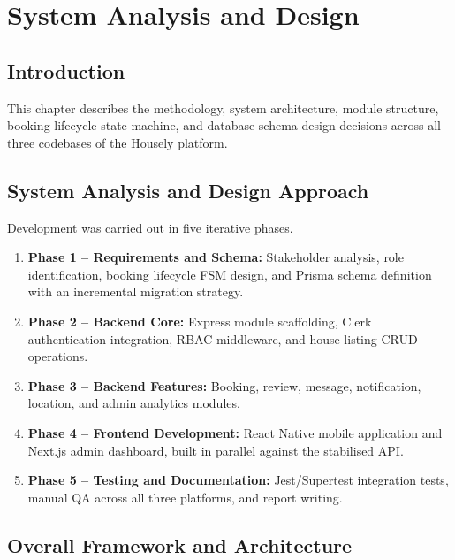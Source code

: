 \documentclass[12pt,a4paper]{report}
\begin{document}
\chapter{System Analysis and Design}
\label{chap:design}

\section{Introduction}

This chapter describes the methodology, system architecture, module structure, booking
lifecycle state machine, and database schema design decisions across all three codebases
of the Housely platform.

\section{System Analysis and Design Approach}

Development was carried out in five iterative phases.

\begin{enumerate}[noitemsep]
  \item \textbf{Phase 1 -- Requirements and Schema:} Stakeholder analysis, role
        identification, booking lifecycle FSM design, and Prisma schema definition with an
        incremental migration strategy.
  \item \textbf{Phase 2 -- Backend Core:} Express module scaffolding, Clerk
        authentication integration, RBAC middleware, and house listing CRUD operations.
  \item \textbf{Phase 3 -- Backend Features:} Booking, review, message, notification,
        location, and admin analytics modules.
  \item \textbf{Phase 4 -- Frontend Development:} React Native mobile application and
        Next.js admin dashboard, built in parallel against the stabilised API.
  \item \textbf{Phase 5 -- Testing and Documentation:} Jest/Supertest integration tests,
        manual QA across all three platforms, and report writing.
\end{enumerate}

\section{Overall Framework and Architecture}
\end{document}
